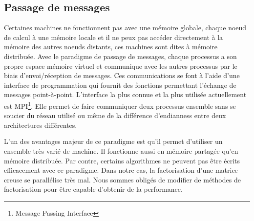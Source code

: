 \subsection{Passage de messages}
Certaines machines ne fonctionnent pas avec une mémoire globale, chaque noeud de calcul à une mémoire locale et il ne peux pas accéder directement à la mémoire des autres noeuds distants, ces machines sont dites à mémoire distribuée.
%
Avec le paradigme de passage de messages, chaque processus a son propre espace mémoire virtuel et communique avec les autres processus par le biais d'envoi/réception de messages.
%
Ces communications se font à l'aide d'une interface de programmation qui fournit des fonctions permettant l'échange de messages point-à-point.
%
L'interface la plus connue et la plus utilisée actuellement est MPI\footnote{Message Passing Interface}.
%
Elle permet de faire communiquer deux processus ensemble sans se soucier du réseau utilisé ou même de la différence d'endianness entre deux architectures différentes.


L'un des avantages majeur de ce paradigme est qu'il permet d'utiliser un ensemble très varié de machine.
%
Il fonctionne aussi en mémoire partagée qu'en mémoire distribuée.
%
Par contre, certains algorithmes ne peuvent pas être écrits efficacement avec ce paradigme.
%
Dans notre cas, la factorisation d'une matrice creuse se parallélise très mal.
%
Nous sommes obligés de modifier de méthodes de factorisation pour être capable d'obtenir de la performance.
